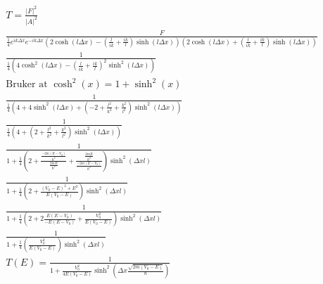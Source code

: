 \documentclass[11pt, A4paper,norsk]{article}
\begin{document}
				\begin{gather*}
T = \frac{|F|^2}{|A|^2} \\
\frac{F}{\frac{1}{4} e^{i k \Delta x} e^{- i k \Delta x} \left( 2 \cosh \left( l \Delta x \right) - \left( \frac{l}{i k} + \frac{i k}{l} \right) \sinh \left( l \Delta x \right) \right) \left( 2 \cosh\left( l \Delta x \right) + \left( \frac{l}{i k} + \frac{i k}{l} \right) \sinh \left( l \Delta x \right) \right)} \\
\frac{1}{\frac{1}{4} \left( 4 \cosh^2 \left( l \Delta x \right) - \left( \frac{l}{i k} + \frac{i k}{l} \right)^2 \sinh^2 \left( l \Delta x \right) \right)} \\
\text{Bruker at $\cosh^2(x) = 1 + \sinh^2(x)$} \\
\frac{1}{\frac{1}{4} \left( 4 + 4 \sinh^2 \left( l \Delta x \right) + \left( - 2 + \frac{l^2}{k^2} + \frac{k^2}{l^2} \right) \sinh^2 \left( l \Delta x \right) \right)} \\
\frac{1}{\frac{1}{4} \left( 4 + \left( 2 + \frac{l^2}{k^2} + \frac{k^2}{l^2} \right) \sinh^2 \left( l \Delta x \right) \right)} \\
\frac{1}{1 + \frac{1}{4} \left( 2 + \frac{\frac{- 2 m (E - V_0)}{\hbar^2}}{\frac{2 m E}{\hbar^2}} + \frac{\frac{2 m E}{\hbar^2}}{\frac{- 2 m (E - V_0)}{\hbar^2}} \right) \sinh^2(\Delta x l)} \\
\frac{1}{1 + \frac{1}{4} \left( 2 + \frac{(V_0 - E)^2 + E^2}{E (V_0 - E)} \right) \sinh^2(\Delta x l)} \\
\frac{1}{1 + \frac{1}{4} \left( 2 + 2 \frac{E (E - V_0)}{- E (E - V_0)} + \frac{V_0^2}{E (V_0 - E)} \right) \sinh^2(\Delta x l)} \\
\frac{1}{1 + \frac{1}{4} \left( \frac{V_0^2}{E (V_0 - E)} \right) \sinh^2(\Delta x l)} \\
T(E) = \frac{1}{1 + \frac{V_0^2}{4 E (V_0 - E)} \sinh^2\left( \Delta x \frac{\sqrt{2 m (V_0 - E)}}{\hbar} \right)}
				\end{gather*}
\end{document}
